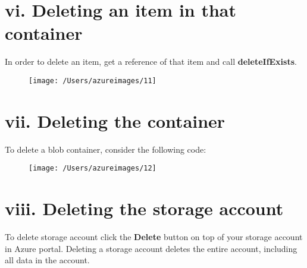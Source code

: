 \documentclass[12pt, letterpaper, twoside]{article}
\begin{document}
\cleardoublepage 		
\section*{vi. Deleting an item in that container}
In order to delete an item, get a reference of that item and call \textbf{deleteIfExists}.
\begin{figure}[H]
	\centering
	\texttt{[image: /Users/azureimages/11]}
\end{figure}
\section*{vii. Deleting the container}
To delete a blob container, consider the following code:
\begin{figure}[H]
	\centering
	\texttt{[image: /Users/azureimages/12]}
\end{figure}
\vspace{1cm}
 \section*{viii. Deleting the storage account}	
 To delete storage account click the \textbf{Delete} button on top of your storage account in Azure portal. Deleting a storage account deletes the entire account, including all data in the account.	
 		
\end{document}
